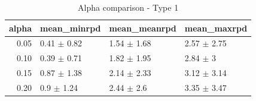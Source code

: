 \begin{table}[ht]
\centering
\begin{tabular}{rlll}
  \hline
alpha & mean_minrpd & mean_meanrpd & mean_maxrpd \\ 
  \hline
0.05 & 0.41 $\pm$ 0.82 & 1.54 $\pm$ 1.68 & 2.57 $\pm$ 2.75 \\ 
  0.10 & 0.39 $\pm$ 0.71 & 1.82 $\pm$ 1.95 & 2.84 $\pm$ 3 \\ 
  0.15 & 0.87 $\pm$ 1.38 & 2.14 $\pm$ 2.33 & 3.12 $\pm$ 3.14 \\ 
  0.20 & 0.9 $\pm$ 1.24 & 2.44 $\pm$ 2.6 & 3.35 $\pm$ 3.47 \\ 
   \hline
\end{tabular}
\caption{Alpha comparison - Type 1} 
\end{table}
